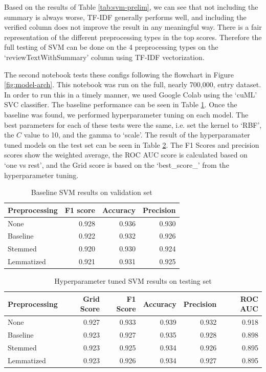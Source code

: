 \documentclass[stu,12pt,floatsintext]{apa7}
\begin{document}
Based on the results of Table \ref{tab:svm-prelim}, we can see that not including the summary is always worse, TF-IDF generally performs well, and including the verified column does not improve the result in any meaningful way. There is a fair representation of the different preprocessing types in the top scores. Therefore the full testing of SVM can be done on the 4 preprocessing types on the `reviewTextWithSummary' column using TF-IDF vectorization.

The second notebook tests these configs following the flowchart in Figure \ref{fig:model-arch}. This notebook was run on the full, nearly 700,000, entry dataset. In order to run this in a timely manner, we used Google Colab using the `cuML' SVC classifier. The baseline performance can be seen in Table \ref{tab:svm-baseline}. Once the baseline was found, we performed hyperparameter tuning on each model. The best parameters for each of these tests were the same, i.e. set the kernel to `RBF', the $C$ value to 10, and the gamma to `scale'. The result of the hyperparamater tuned models on the test set can be seen in Table \ref{tab:svm-final}. The F1 Scores and precision scores show the weighted average, the ROC AUC score is calculated based on `one vs rest', and the Grid score is based on the `best\_score\_' from the hyperparameter tuning. 

\begin{table}[!htb]
    \centering
    \caption{Baseline SVM results on validation set}

    \begin{tabular}{lrrr}
    \hline
    Preprocessing & F1 score & Accuracy & Precision \\
    \hline
    None & 0.928 & 0.936 & 0.930 \\
    Baseline & 0.922 & 0.932 & 0.926 \\
    Stemmed & 0.920 & 0.930 & 0.924 \\
    Lemmatized & 0.921 & 0.931 & 0.925 \\
    \hline
    \end{tabular}

    \label{tab:svm-baseline}
\end{table}


\begin{table}[!htb]
    \centering
    \caption{Hyperparameter tuned SVM results on testing set}

    \begin{tabular}{lrrrrr}
    \hline
    Preprocessing & Grid Score & F1 Score & Accuracy & Precision & ROC AUC \\
    \hline
    None & 0.927 & 0.933 & 0.939 & 0.932 & 0.918 \\
    Baseline & 0.923 & 0.927 & 0.935 & 0.928 & 0.898 \\
    Stemmed & 0.923 & 0.925 & 0.934 & 0.926 & 0.895 \\
    Lemmatized & 0.923 & 0.926 & 0.934 & 0.927 & 0.895 \\
    \hline
    \end{tabular}


    \label{tab:svm-final}
\end{table}
\end{document}

